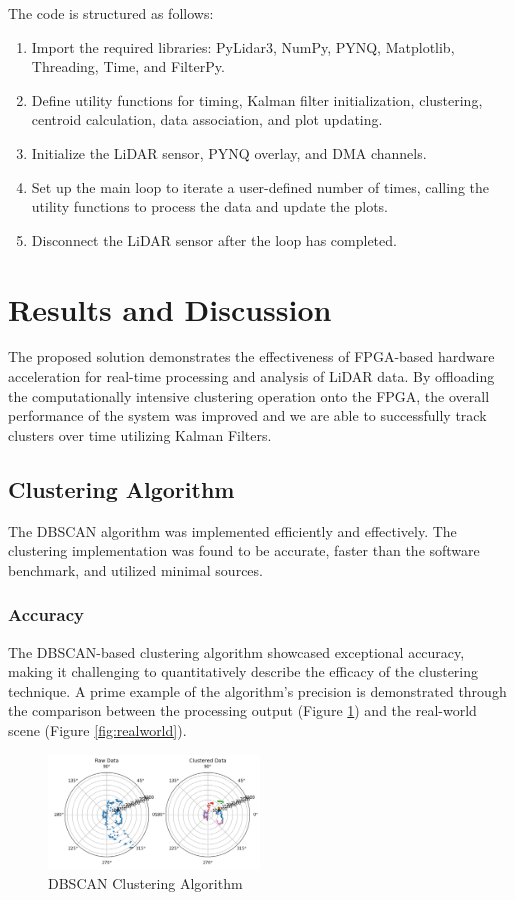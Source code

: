 \documentclass[journal]{IEEEtran} %
\begin{document}
The code is structured as follows:
\begin{enumerate}
\item Import the required libraries: PyLidar3, NumPy, PYNQ, Matplotlib, Threading, Time, and FilterPy.
\item Define utility functions for timing, Kalman filter initialization, clustering, centroid calculation, data association, and plot updating.
\item Initialize the LiDAR sensor, PYNQ overlay, and DMA channels.
\item Set up the main loop to iterate a user-defined number of times, calling the utility functions to process the data and update the plots.
\item Disconnect the LiDAR sensor after the loop has completed.
\end{enumerate}

\section{Results and Discussion}

The proposed solution demonstrates the effectiveness of FPGA-based hardware acceleration for real-time processing and analysis of LiDAR data. By offloading the computationally intensive clustering operation onto the FPGA, the overall performance of the system was improved and we are able to successfully track clusters over time utilizing Kalman Filters.

\subsection{Clustering Algorithm}
The DBSCAN algorithm was implemented efficiently and effectively. The clustering implementation was found to be accurate, faster than the software benchmark, and utilized minimal sources.\\

\subsubsection{Accuracy}
The DBSCAN-based clustering algorithm showcased exceptional accuracy, making it challenging to quantitatively describe the efficacy of the clustering technique. A prime example of the algorithm's precision is demonstrated through the comparison between the processing output (Figure \ref{fig:dbscan}) and the real-world scene (Figure \ref{fig:realworld}).

\begin{figure}[h]
  \centering
  \includegraphics[width=0.5\textwidth]{clusterAccuracy.PNG}
  \caption{DBSCAN Clustering Algorithm}
  \label{fig:dbscan}
\end{figure}
\end{document}
